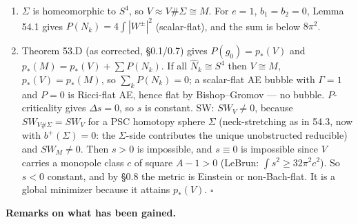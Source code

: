\documentclass[
  10pt,
]{report}
\begin{document}
\begin{enumerate}
\def\labelenumi{(\roman{enumi})}
\setcounter{enumi}{1}
\item
  \(\Sigma\) is homeomorphic to \(S^4\), so
  \(V\approx V\#\Sigma\cong M\). For \(e=1\), \(b_1=b_2=0\), Lemma 54.1
  gives \(P(N_k)=4\int|W^\pm|^2\) (scalar-flat), and the sum is below
  \(8\pi^2\).
\item
  Theorem 53.D (as corrected, §0.1/0.7) gives \(P(g_0)=p_*(V)\) and
  \(p_*(M)=p_*(V)+\sum P(N_k)\). If all \(\widehat N_k\cong S^4\) then
  \(V\cong M\), \(p_*(V)=p_*(M)\), so \(\sum_kP(N_k)=0\); a scalar-flat
  AE bubble with \(\Gamma=1\) and \(P=0\) is Ricci-flat AE, hence flat
  by Bishop--Gromov --- no bubble. \(P\)-criticality gives
  \(\Delta s=0\), so \(s\) is constant. SW: \(SW_V\neq0\), because
  \(SW_{V\#\Sigma}=SW_V\) for a PSC homotopy sphere \(\Sigma\)
  (neck-stretching as in 54.3, now with \(b^+(\Sigma)=0\): the
  \(\Sigma\)-side contributes the unique unobstructed reducible) and
  \(SW_M\ne0\). Then \(s>0\) is impossible, and \(s\equiv0\) is
  impossible since \(V\) carries a monopole class \(c\) of square
  \(A-1>0\) (LeBrun: \(\int s^2\ge32\pi^2c^2\)). So \(s<0\) constant,
  and by §0.8 the metric is Einstein or non-Bach-flat. It is a global
  minimizer because it attains \(p_*(V)\). \(\square\)
\end{enumerate}

\textbf{Remarks on what has been gained.}
\end{document}
